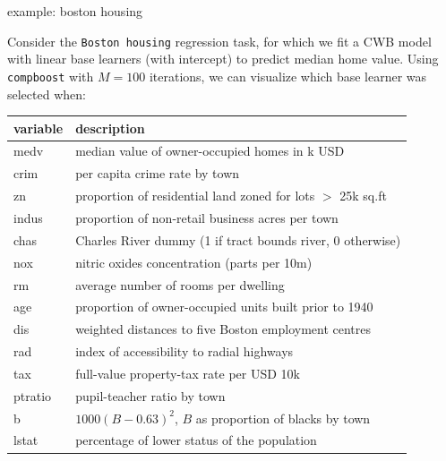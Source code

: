\documentclass[11pt,compress,t,notes=noshow, xcolor=table]{beamer}
\begin{document}


{}

\begin{vbframe}{example: boston housing}

\begin{minipage}[c]{0.4\textwidth}
  \small
  \raggedright
  Consider the \texttt{Boston housing} regression task, for which we fit a
  CWB model with linear base learners (with intercept) to predict median home
  value.
  Using \texttt{compboost} with $M = 100$ iterations, we can
  visualize which base learner was selected when:
\end{minipage}%
\begin{minipage}[c]{0.05\textwidth}
  \phantom{foo}
\end{minipage}%
\begin{minipage}[c]{0.55\textwidth}
  \tiny
  \begin{tabular}{l|l}
    \textbf{variable} & \textbf{description} \\
    \hline
    medv &	median value of owner-occupied homes in k USD \\
    \hline
    crim & per capita crime rate by town \\
    zn &	proportion of residential land zoned for lots $>$ 25k sq.ft \\
    indus &	proportion of non-retail business acres per town \\
    chas &	Charles River dummy (1 if tract bounds river, 0 otherwise) \\
    nox &	nitric oxides concentration (parts per 10m) \\
    rm &	average number of rooms per dwelling \\
    age &	proportion of owner-occupied units built prior to 1940 \\
    dis &	weighted distances to five Boston employment centres \\
    rad &	index of accessibility to radial highways \\
    tax &	full-value property-tax rate per USD 10k \\
    ptratio &	pupil-teacher ratio by town \\
    b &	$1000(B - 0.63)^2$,  $B$ as proportion of blacks by town \\
    lstat &	percentage of lower status of the population \\
  \end{tabular}
\end{minipage}%


\end{vbframe}
\end{document}
